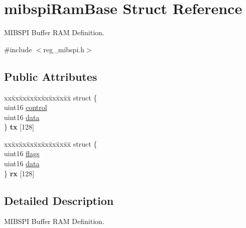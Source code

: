 \hypertarget{structmibspiRamBase}{}\section{mibspi\+Ram\+Base Struct Reference}
\label{structmibspiRamBase}


M\+I\+B\+S\+PI Buffer R\+AM Definition.  




{\ttfamily \#include $<$reg\+\_\+mibspi.\+h$>$}

\subsection*{Public Attributes}
\begin{DoxyCompactItemize}
\item 
\mbox{\label{structmibspiRamBase_ad9390f7a528733abc7e46ff41ebb5d7d}} 
\begin{tabbing}
xx\=xx\=xx\=xx\=xx\=xx\=xx\=xx\=xx\=\kill
struct \{\\
\>uint16 \mbox{\hyperlink{structmibspiRamBase_ac96ab60a96dcd73e510dde85eb28b90d}{control}}\\
\>uint16 \mbox{\hyperlink{structmibspiRamBase_a1fe10494816123842ffb8fb7ba9cbc42}{data}}\\
\} {\bfseries tx} \mbox{[}128\mbox{]}\\

\end{tabbing}\item 
\mbox{\label{structmibspiRamBase_afc7756b867880a2b3adc648ee5f62c23}} 
\begin{tabbing}
xx\=xx\=xx\=xx\=xx\=xx\=xx\=xx\=xx\=\kill
struct \{\\
\>uint16 \mbox{\hyperlink{structmibspiRamBase_a510d1c79ffd0312d12bfe0ba70fbfbdc}{flags}}\\
\>uint16 \mbox{\hyperlink{structmibspiRamBase_a1fe10494816123842ffb8fb7ba9cbc42}{data}}\\
\} {\bfseries rx} \mbox{[}128\mbox{]}\\

\end{tabbing}\end{DoxyCompactItemize}


\subsection{Detailed Description}
M\+I\+B\+S\+PI Buffer R\+AM Definition. 

